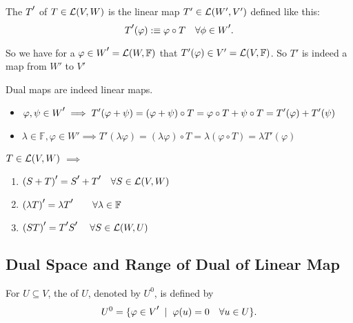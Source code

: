 \setcounter{thm}{117}
\begin{mydef}
  The  $\dual{T}$ of $T \in \mathcal{L}(V,W)$ is the linear map $T' \in {\mathcal{L}(W', V')}$ defined like this:
\begin{equation}
    \dual{T}(\varphi) :\equiv \varphi \circ T \quad \forall \phi \in \dual{W}.
\end{equation}

    So we have for a $\varphi \in \dual{W}=\lin{W}{\mathbb{F}}$ that $T'(\varphi) \in V' = {\mathcal{L}(V, \mathbb{F})}$. So $T'$ is indeed a map from $W'$ to $V'$

    Dual maps are indeed linear maps.
\begin{itemize}
      \item $\varphi, \psi \in \dual{W} \implies T' (\varphi + \psi) = (\varphi + \psi) \circ T = \varphi \circ T + \psi \circ T = T' (\varphi) + T'(\psi)$
    \item $\lambda \in \mathbb{F}, \varphi \in W' \implies T' (\lambda \varphi) = (\lambda \varphi) \circ T = \lambda (\varphi \circ T) = \lambda T' (\varphi)$
\end{itemize}


\end{mydef}

\setcounter{thm}{119}
\begin{thm} 
  \label{algebraic-properties-of-dual-maps}
  $T \in \mathcal{L}(V,W)$ $\implies$
  \begin{enumerate}[label=\textbf{(\alph*)}]
    \item $\dual{(S+T)} = \dual{S} + \dual{T} \quad \forall S \in \linmap(V,W)$
    \item $\dual{(\lambda T)} = \lambda \dual{T} \quad \quad \forall \lambda \in \myF$
    \item $\dual{(ST)} = \dual{T}\dual{S} \quad \; \forall S \in \linmap (W,U)$
  \end{enumerate}
\end{thm}



\subsection{Dual Space and Range of Dual of Linear Map}

\begin{mydef} [annihilator, $U^0$]
  \label{def: annihiltator}
  For $U \subseteq V$, the  of $U$, denoted by $U^{0}$, is defined by
  \begin{equation}
    U^0 = \{ \varphi \in \dual{V} \; \mid \; \varphi (u) = 0 \quad \forall u \in U \}.
  \end{equation}
\end{mydef}

